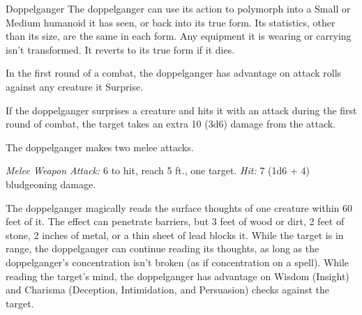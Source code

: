 \documentclass[10pt,a4paper,twoside,bg=print,twocolumn,openany,nodeprecatedcode]{dndbook}
\begin{document}
\begin{DndMonster}[float=t]{Doppelganger}
\DndMonsterBasics[
armor-class = {14},
hit-points = {\DndDice{8d8 + 16}},
speed = {30 ft.}
]
\DndMonsterAbilityScores[
 str = 11,
 dex = 18,
 con = 14,
 int = 11,
 wis = 12,
 cha = 14
]
\DndMonsterDetails[
skills = {Deception +6, Insight +3},
condition-immunities = {charmed},
senses = {darkvision 60 ft., passive perception 11},
languages = {Common},
challenge = 3,
]
The doppelganger can use its action to polymorph into a Small or Medium humanoid it has seen, or back into its true form. Its statistics, other than its size, are the same in each form. Any equipment it is wearing or carrying isn't transformed. It reverts to its true form if it dies.

In the first round of a combat, the doppelganger has advantage on attack rolls against any creature it Surprise.

If the doppelganger surprises a creature and hits it with an attack during the first round of combat, the target takes an extra 10 (3d6) damage from the attack.

The doppelganger makes two melee attacks.

\textsl{Melee Weapon Attack:} 6 to hit, reach 5 ft., one target. \textsl{Hit:} 7 (1d6 + 4) bludgeoning damage.

The doppelganger magically reads the surface thoughts of one creature within 60 feet of it. The effect can penetrate barriers, but 3 feet of wood or dirt, 2 feet of stone, 2 inches of metal, or a thin sheet of lead blocks it. While the target is in range, the doppelganger can continue reading its thoughts, as long as the doppelganger's concentration isn't broken (as if concentration on a spell). While reading the target's mind, the doppelganger has advantage on Wisdom (Insight) and Charisma (Deception, Intimidation, and Persuasion) checks against the target.

\end{DndMonster}
\end{document}
